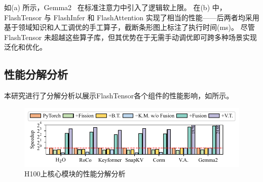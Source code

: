 


如(a) 所示，Gemma2~\cite{team2024gemma2} 在标准注意力中引入了逻辑软上限。
在(b) 中，FlashTensor 与 FlashInfer 和 FlashAttention 实现了相当的性能——后两者均采用基于领域知识和人工调优的手工算子，截断条形图上标注了执行时间(ms)。
尽管 FlashTensor 未超越这些算子库，但其优势在于无需手动调优即可跨多种场景实现泛化和优化。




\subsection{性能分解分析}
本研究进行了分解分析以展示FlashTensor各个组件的性能影响，如所示。
\begin{figure}[ht]
    \centering
    \includegraphics[width=0.85\linewidth]{figures/flashtensor/breakdown.pdf}
    \caption{H100上核心模块的性能分解分析}
    \label{fig:breakdown}
\end{figure}

